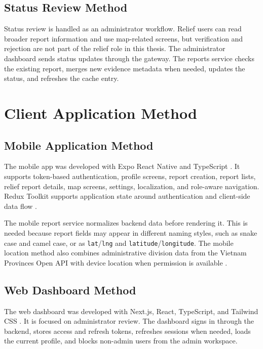 \subsection{Status Review Method}

Status review is handled as an administrator workflow. Relief users can read broader report information and use map-related screens, but verification and rejection are not part of the relief role in this thesis. The administrator dashboard sends status updates through the gateway. The reports service checks the existing report, merges new evidence metadata when needed, updates the status, and refreshes the cache entry.

\section{Client Application Method}

\subsection{Mobile Application Method}

The mobile app was developed with Expo React Native and TypeScript \cite{expoDocs,reactNativeDocs,typescriptDocs}. It supports token-based authentication, profile screens, report creation, report lists, relief report details, map screens, settings, localization, and role-aware navigation. Redux Toolkit supports application state around authentication and client-side data flow \cite{reduxToolkitDocs}.

The mobile report service normalizes backend data before rendering it. This is needed because report fields may appear in different naming styles, such as snake case and camel case, or as \texttt{lat}/\texttt{lng} and \texttt{latitude}/\texttt{longitude}. The mobile location method also combines administrative division data from the Vietnam Provinces Open API with device location when permission is available \cite{vietnamProvincesOpenApi}.

\subsection{Web Dashboard Method}

The web dashboard was developed with Next.js, React, TypeScript, and Tailwind CSS \cite{nextjsDocs,reactDocs,typescriptDocs,tailwindDocs}. It is focused on administrator review. The dashboard signs in through the backend, stores access and refresh tokens, refreshes sessions when needed, loads the current profile, and blocks non-admin users from the admin workspace.

